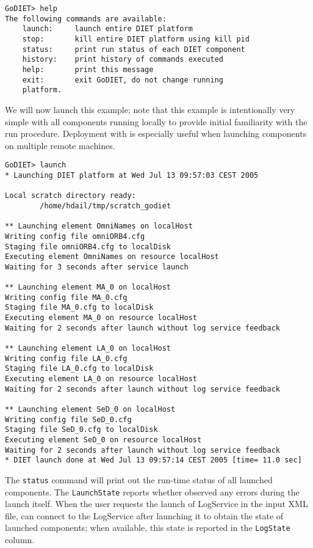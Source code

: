 \begin{verbatim}
GoDIET> help
The following commands are available:
    launch:     launch entire DIET platform
    stop:       kill entire DIET platform using kill pid
    status:     print run status of each DIET component
    history:    print history of commands executed
    help:       print this message
    exit:       exit GoDIET, do not change running
    platform.
\end{verbatim}

We will now launch this example; note that this example is intentionally very 
simple with all components running locally to provide initial familiarity 
with the \godiet run procedure.  Deployment with \godiet is especially useful 
when launching components on multiple remote machines.

\begin{verbatim}
GoDIET> launch
* Launching DIET platform at Wed Jul 13 09:57:03 CEST 2005

Local scratch directory ready:
        /home/hdail/tmp/scratch_godiet

** Launching element OmniNames on localHost
Writing config file omniORB4.cfg
Staging file omniORB4.cfg to localDisk
Executing element OmniNames on resource localHost
Waiting for 3 seconds after service launch

** Launching element MA_0 on localHost
Writing config file MA_0.cfg
Staging file MA_0.cfg to localDisk
Executing element MA_0 on resource localHost
Waiting for 2 seconds after launch without log service feedback

** Launching element LA_0 on localHost
Writing config file LA_0.cfg
Staging file LA_0.cfg to localDisk
Executing element LA_0 on resource localHost
Waiting for 2 seconds after launch without log service feedback

** Launching element SeD_0 on localHost
Writing config file SeD_0.cfg
Staging file SeD_0.cfg to localDisk
Executing element SeD_0 on resource localHost
Waiting for 2 seconds after launch without log service feedback
* DIET launch done at Wed Jul 13 09:57:14 CEST 2005 [time= 11.0 sec]
\end{verbatim}

The \texttt{status} command will print out the run-time status of all launched 
components.  The \texttt{LaunchState} reports whether \godiet observed
any errors during the launch itself.  When the user requests the launch
of LogService in the input XML file, \godiet can connect to the LogService 
after launching it to obtain the state of launched components; when
available, this state is reported in the \texttt{LogState} column.

